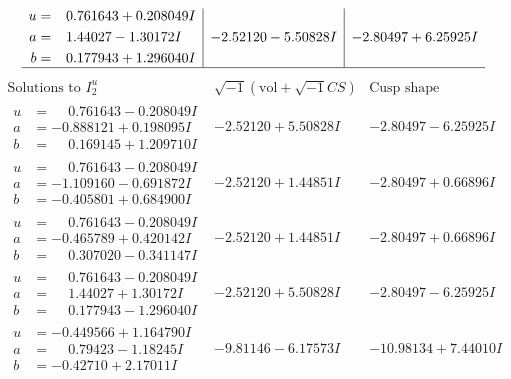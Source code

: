 \documentclass[1p]{elsarticle_modified}
\theoremstyle{definition}
\newcommand{\I}{\sqrt{-1}}
\begin{document}
$$\begin{array}{c|c|c}
\begin{aligned}
u &= \phantom{-}0.761643 + 0.208049 I \\
a &= \phantom{-}1.44027 - 1.30172 I \\
b &= \phantom{-}0.177943 + 1.296040 I\end{aligned}
 & -2.52120 - 5.50828 I & -2.80497 + 6.25925 I\\
 \hline 
 \end{array}$$\newpage$$\begin{array}{c|c|c}  
\text{Solutions to }I^u_{2}& \I (\text{vol} + \sqrt{-1}CS) & \text{Cusp shape}\\
 \hline 
\begin{aligned}
u &= \phantom{-}0.761643 - 0.208049 I \\
a &= -0.888121 + 0.198095 I \\
b &= \phantom{-}0.169145 + 1.209710 I\end{aligned}
 & -2.52120 + 5.50828 I & -2.80497 - 6.25925 I \\ \hline\begin{aligned}
u &= \phantom{-}0.761643 - 0.208049 I \\
a &= -1.109160 - 0.691872 I \\
b &= -0.405801 + 0.684900 I\end{aligned}
 & -2.52120 + 1.44851 I & -2.80497 + 0.66896 I \\ \hline\begin{aligned}
u &= \phantom{-}0.761643 - 0.208049 I \\
a &= -0.465789 + 0.420142 I \\
b &= \phantom{-}0.307020 - 0.341147 I\end{aligned}
 & -2.52120 + 1.44851 I & -2.80497 + 0.66896 I \\ \hline\begin{aligned}
u &= \phantom{-}0.761643 - 0.208049 I \\
a &= \phantom{-}1.44027 + 1.30172 I \\
b &= \phantom{-}0.177943 - 1.296040 I\end{aligned}
 & -2.52120 + 5.50828 I & -2.80497 - 6.25925 I \\ \hline\begin{aligned}
u &= -0.449566 + 1.164790 I \\
a &= \phantom{-}0.79423 - 1.18245 I \\
b &= -0.42710 + 2.17011 I\end{aligned}
 & -9.81146 - 6.17573 I & -10.98134 + 7.44010 I \\ \hline\begin{aligned}

\end{aligned}
\end{array}$$
\end{document}
